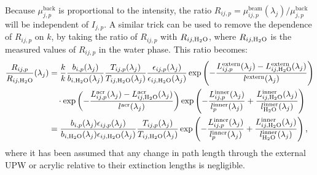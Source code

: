 \begin{figure}
    \centering
    \caption[]{}
    \label{fig:smellie_back_PMTs_tres_plot}
\end{figure}

Because $\mu_{j,p}^{\mathrm{back}}$ is proportional to the intensity, the ratio $R_{ij,p} = \mu_{ij,p}^{\mathrm{beam}}(\lambda_{j})/\mu_{j,p}^{\mathrm{back}}$ will be independent of $I_{j,p}$. A similar trick can be used to remove the dependence of $R_{ij,p}$ on $k$, by taking the ratio of $R_{ij,p}$ with $R_{ij,\ce{H_{2}O}}$, where $R_{ij,\ce{H_{2}O}}$ is the measured values of $R_{ij,p}$ in the water phase. This ratio becomes:
\begin{align}
    \frac{R_{ij,p}}{R_{ij,\ce{H_{2}O}}}(\lambda_{j}) 
    &= \frac{k}{k}
    \frac{b_{i,p}(\lambda_{j})}{b_{i,\ce{H_{2}O}}(\lambda_{j})}
    \frac{T_{ij,p}(\lambda_{j})}{T_{ij,\ce{H_{2}O}}(\lambda_{j})}
    \frac{\epsilon_{ij,p}(\lambda_{j})}{\epsilon_{ij,\ce{H_{2}O}}(\lambda_{j})}
    \exp\left(
        -\frac{L_{ij,p}^{\mathrm{extern}}(\lambda_{j})-L_{ij,\ce{H_{2}O}}^{\mathrm{extern}}(\lambda_{j})}{l^{\mathrm{extern}}(\lambda_{j})}
    \right)
    \nonumber\\
    & \quad \cdot \exp\left(
        -\frac{L_{ij,p}^{\mathrm{acr}}(\lambda_{j})-L_{ij,\ce{H_{2}O}}^{\mathrm{acr}}(\lambda_{j})}{l^{\mathrm{acr}}(\lambda_{j})}
    \right)
    \exp\left(
        -\frac{L_{ij,p}^{\mathrm{inner}}(\lambda_{j})}{l_{p}^{\mathrm{inner}}(\lambda_{j})}
        +\frac{L_{ij,\ce{H_{2}O}}^{\mathrm{inner}}(\lambda_{j})}{l_{\ce{H_{2}O}}^{\mathrm{inner}}(\lambda_{j})}
    \right)
    \nonumber\\
    &= \frac{b_{i,p}(\lambda_{j})\epsilon_{ij,p}(\lambda_{j})}{b_{i,\ce{H_{2}O}}(\lambda_{j})\epsilon_{ij,\ce{H_{2}O}}(\lambda_{j})}
    \frac{T_{ij,p}(\lambda_{j})}{T_{ij,\ce{H_{2}O}}(\lambda_{j})}
    \exp\left(
        -\frac{L_{ij,p}^{\mathrm{inner}}(\lambda_{j})}{l_{p}^{\mathrm{inner}}(\lambda_{j})}
        +\frac{L_{ij,\ce{H_{2}O}}^{\mathrm{inner}}(\lambda_{j})}{l_{\ce{H_{2}O}}^{\mathrm{inner}}(\lambda_{j})}
    \right),
\end{align}
where it has been assumed that any change in path length through the external UPW or acrylic relative to their extinction lengths is negligible.

